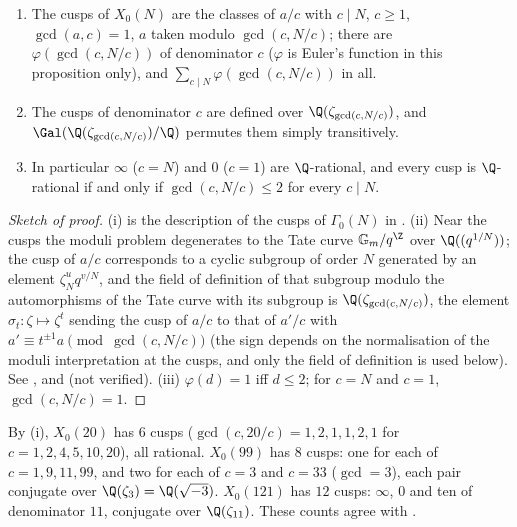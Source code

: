 \begin{proposition}\label{prop:moddeg:cusps-over-q}
\leavevmode
\begin{enumerate}[label=(\roman*)]
\item The cusps of $X_0(N)$ are the classes of $a/c$ with $c\mid N$, $c\ge1$, $\gcd(a,c)=1$, $a$ taken modulo $\gcd(c,N/c)$; there are
$\varphi(\gcd(c,N/c))$ of denominator $c$ ($\varphi$ is Euler's function in this proposition only), and $\sum_{c\mid N}\varphi(\gcd(c,N/c))$ in all.
\item The cusps of denominator $c$ are defined over $\Q(\zeta_{\gcd(c,N/c)})$, and $\Gal(\Q(\zeta_{\gcd(c,N/c)})/\Q)$ permutes them simply transitively.
\item In particular $\infty$ ($c=N$) and $0$ ($c=1$) are $\Q$-rational, and every cusp is $\Q$-rational if and only if $\gcd(c,N/c)\le2$ for every $c\mid N$.
\end{enumerate}
\end{proposition}

\begin{proof}[Sketch of proof]
(i) is the description of the cusps of $\Gamma_0(N)$ in . (ii) Near the cusps the moduli problem degenerates to the Tate curve
$\mathbb G_m/q^{\Z}$ over $\Q((q^{1/N}))$; the cusp of $a/c$ corresponds to a cyclic subgroup of order $N$ generated by an element $\zeta_N^{u}q^{v/N}$, and
the field of definition of that subgroup modulo the automorphisms of the Tate curve with its subgroup is $\Q(\zeta_{\gcd(c,N/c)})$, the element
$\sigma_t\colon\zeta\mapsto\zeta^t$ sending the cusp of $a/c$ to that of $a'/c$ with $a'\equiv t^{\pm1}a\pmod{\gcd(c,N/c)}$ (the sign depends on the normalisation of the
moduli interpretation at the cusps, and only the field of definition is used below). See \cite{Ogg73}, \cite[Section 6.3]{Stein} and
\cite[Chapter 3, exercises]{DiamondShurman} (not verified). (iii) $\varphi(d)=1$ iff $d\le2$; for $c=N$ and $c=1$, $\gcd(c,N/c)=1$.
\end{proof}

\begin{example}\label{ex:moddeg:cusps}
By (i), $X_0(20)$ has $6$ cusps ($\gcd(c,20/c)=1,2,1,1,2,1$ for $c=1,2,4,5,10,20$), all rational. $X_0(99)$ has $8$ cusps: one for each of $c=1,9,11,99$, and two
for each of $c=3$ and $c=33$ ($\gcd=3$), each pair conjugate over $\Q(\zeta_3)=\Q(\sqrt{-3})$. $X_0(121)$ has $12$ cusps: $\infty$, $0$ and ten of denominator $11$,
conjugate over $\Q(\zeta_{11})$. These counts agree with .
\end{example}

